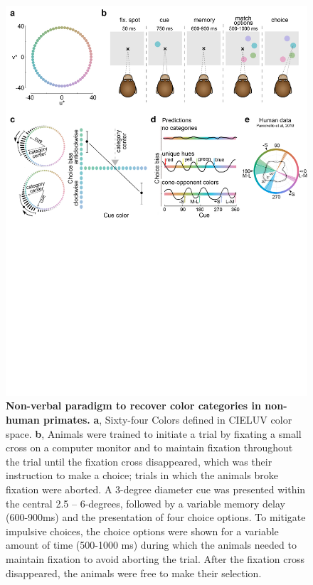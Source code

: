 \begin{figure}
    \begin{fullwidth}
    \centering
    \includegraphics[width=\textwidth+4cm,trim={0 12.5cm 0 0},clip]{../Figures/flat/Fig1_ParadigmPredictions_7.jpg}
    \caption{\textbf{Non-verbal paradigm to recover color categories in non-human primates.}
    \textbf{a}, Sixty-four Colors defined in CIELUV color space. 
	\textbf{b}, Animals were trained to initiate a trial by fixating a small cross on a computer monitor and to maintain fixation throughout the trial until the fixation cross disappeared, which was their instruction to make a choice; trials in which the animals broke fixation were aborted. 
	A 3-degree diameter cue was presented within the central 2.5 – 6-degrees, followed by a variable memory delay (600-900ms) and the presentation of four choice options. 
	To mitigate impulsive choices, the choice options were shown for a variable amount of time (500-1000 ms) during which the animals needed to maintain fixation to avoid aborting the trial. After the fixation cross disappeared, the animals were free to make their selection. 
}
\end{fullwidth}
\end{figure}
